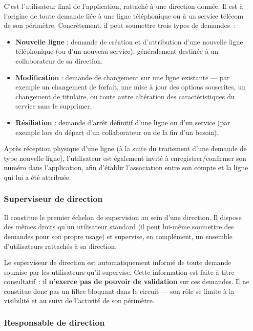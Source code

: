 \documentclass[11pt,a4paper]{article}
\begin{document}
C'est l'utilisateur final de l'application, rattaché à une direction donnée. Il est à l'origine de toute demande liée à une ligne téléphonique ou à un service télécom de son périmètre. Concrètement, il peut soumettre trois types de demandes~:

\begin{itemize}
    \item \textbf{Nouvelle ligne} : demande de création et d'attribution d'une nouvelle ligne téléphonique (ou d'un nouveau service), généralement destinée à un collaborateur de sa direction.
    \item \textbf{Modification} : demande de changement sur une ligne existante --- par exemple un changement de forfait, une mise à jour des options souscrites, un changement de titulaire, ou toute autre altération des caractéristiques du service sans le supprimer.
    \item \textbf{Résiliation} : demande d'arrêt définitif d'une ligne ou d'un service (par exemple lors du départ d'un collaborateur ou de la fin d'un besoin).
\end{itemize}

Après réception physique d'une ligne (à la suite du traitement d'une demande de type nouvelle ligne), l'utilisateur est également invité à enregistrer/confirmer son numéro dans l'application, afin d'établir l'association entre son compte et la ligne qui lui a été attribuée.

\subsubsection{Superviseur de direction}

Il constitue le premier échelon de supervision au sein d'une direction. Il dispose des mêmes droits qu'un utilisateur standard (il peut lui-même soumettre des demandes pour son propre usage) et supervise, en complément, un ensemble d'utilisateurs rattachés à sa direction.

Le superviseur de direction est automatiquement informé de toute demande soumise par les utilisateurs qu'il supervise. Cette information est faite à titre consultatif~: il \textbf{n'exerce pas de pouvoir de validation} sur ces demandes. Il ne constitue donc pas un filtre bloquant dans le circuit --- son rôle se limite à la visibilité et au suivi de l'activité de son périmètre.

\subsubsection{Responsable de direction}
\end{document}
